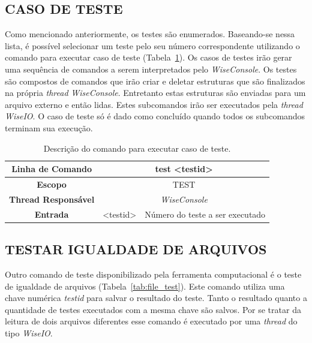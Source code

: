 \subsection{CASO DE TESTE}\label{sec:case list}

Como mencionado anteriormente, os testes são enumerados. Baseando-se nessa lista, é possível selecionar um teste pelo seu número correspondente utilizando o comando para executar caso de teste (Tabela~\ref{tab:case_test}). Os casos de testes irão gerar uma sequência de comandos a serem interpretados pelo \textit{WiseConsole}. Os testes são compostos de comandos que irão criar e deletar estruturas que são finalizados na própria \textit{thread} \textit{WiseConsole}. Entretanto estas estruturas são enviadas para um arquivo externo e então lidas. Estes subcomandos irão ser executados pela \textit{thread} \textit{WiseIO}. O caso de teste só é dado como concluído quando todos os subcomandos terminam sua execução.

\begin{center}
	\begin{table}[!htbp]
		\begin{tabularx}{\textwidth}{c|c|X}
			\toprule
			\textbf{Linha de Comando} & \multicolumn{2}{c}{test <test\underline{\space}id>} \\
			\midrule
			\textbf{Escopo} & \multicolumn{2}{c}{TEST} \\
			\hline
			\textbf{Thread Responsável} & \multicolumn{2}{c}{\textit{WiseConsole}} \\
			\hline
			\textbf{Entrada} & <test\underline{\space}id> & Número do teste a ser executado \\
			\bottomrule
		\end{tabularx}
		\caption{Descrição do comando para executar caso de teste.}
		\label{tab:case_test}
	\end{table}
\end{center}

\subsection{TESTAR IGUALDADE DE ARQUIVOS}\label{sec:test_file}

Outro comando de teste disponibilizado pela ferramenta computacional é o teste de igualdade de arquivos (Tabela~\ref{tab:file_test}). Este comando utiliza uma chave numérica \textit{test\underline{\space}id} para salvar o resultado do teste. Tanto o resultado quanto a quantidade de testes executados com a mesma chave são salvos. Por se tratar da leitura de dois arquivos diferentes esse comando é executado por uma \textit{thread} do tipo \textit{WiseIO}.

